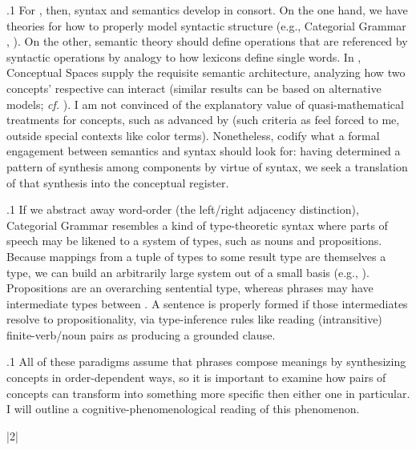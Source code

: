 \documentclass[11pt, twocolumn]{article}
\begin{document}
\p.1{%
\:\+For \Boltetal{}, then, syntax and semantics develop in 
consort. \> On the
one hand, we have theories for how to properly model syntactic
structure (e.g., Categorial Grammar , ). \> On the other, semantic theory
should define operations that are referenced by syntactic operations
by analogy to how lexicons define single words. \> In , Conceptual Spaces
supply the requisite semantic architecture, analyzing how
two concepts' respective  can interact (similar
results can be based on alternative 
models; \textit{cf.} ). \> I 
am not convinced of the explanatory value of
quasi-mathematical treatments for concepts, such as
advanced by \Gardenfors{} (such criteria as 
feel forced to me, outside special contexts like color 
terms). \> Nonetheless, \Boltetal{} codify what a formal engagement
between semantics and syntax should look for: having determined
a pattern of synthesis among components by
virtue of syntax, we seek a translation of that
synthesis into the conceptual register.\<\;
} %

\p.1{%
\:\+If we abstract away word-order (the left/right adjacency distinction),
Categorial Grammar resembles a kind of type-theoretic syntax
where parts of speech may be likened to a system of types,
such as nouns and propositions. \> Because mappings from a tuple
of types to some result type are themselves a type,
we can build an arbitrarily large system
out of a small basis (e.g., \nslashp{}). \> Propositions 
are an overarching sentential type,
whereas phrases may have intermediate types between
\pANDn{}. \> A sentence is properly
formed if those intermediates resolve to propositionality,
via type-inference rules like reading (intransitive)
finite-verb/noun
pairs as producing a grounded clause.\<\;
} %

\p.1{%
\:\+All of these paradigms assume that phrases compose
meanings by synthesizing concepts in order-dependent
ways, so it is important to examine how pairs of
concepts can transform into something more specific
then either one in particular. \> I will outline a
cognitive-phenomenological reading of 
this phenomenon.\<\; \vspace{6pt}
} %


\s|2|{}
\end{document}
